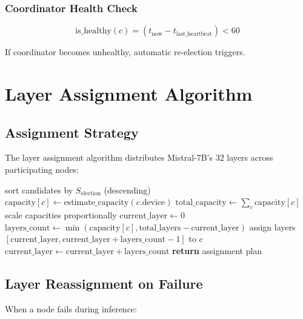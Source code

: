 \documentclass[12pt,a4paper]{article}
\begin{document}
\subsubsection{Coordinator Health Check}
\begin{equation}
\text{is\_healthy}(c) = (t_{\text{now}} - t_{\text{last\_heartbeat}}) < 60
\end{equation}

If coordinator becomes unhealthy, automatic re-election triggers.

\section{Layer Assignment Algorithm}

\subsection{Assignment Strategy}

The layer assignment algorithm distributes Mistral-7B's 32 layers across participating nodes:

\begin{algorithm}
\caption{Layer Assignment}
\begin{algorithmic}[1]
    \State sort candidates by $S_{\text{election}}$ (descending)
        \State $\text{capacity}[c] \gets \text{estimate\_capacity}(c.\text{device})$
    \EndFor
    \State $\text{total\_capacity} \gets \sum_c \text{capacity}[c]$
        \State scale capacities proportionally
    \EndIf
    \State $\text{current\_layer} \gets 0$
        \State $\text{layers\_count} \gets \min(\text{capacity}[c], \text{total\_layers} - \text{current\_layer})$
        \State assign layers $[\text{current\_layer}, \text{current\_layer} + \text{layers\_count} - 1]$ to $c$
        \State $\text{current\_layer} \gets \text{current\_layer} + \text{layers\_count}$
    \EndFor
    \State \textbf{return} assignment plan
\EndProcedure
\end{algorithmic}
\end{algorithm}

\subsection{Layer Reassignment on Failure}

When a node fails during inference:
\end{document}
